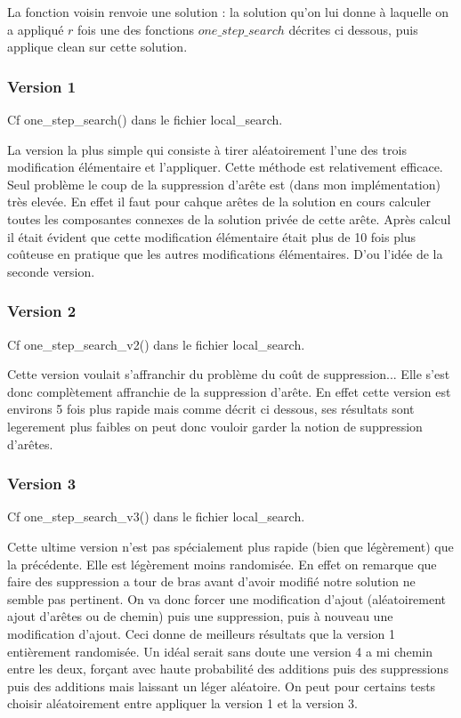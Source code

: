 \documentclass[10pt,a4paper]{article}
\begin{document}
La fonction voisin renvoie une solution : la solution qu'on lui donne à laquelle on a appliqué $r$ fois une des fonctions $one\_step\_search$ décrites ci dessous, puis applique clean sur cette solution.

\subsubsection{Version 1}

Cf one\_step\_search() dans le fichier local\_search.

La version la plus simple qui consiste à tirer aléatoirement l'une des trois modification élémentaire et l'appliquer. Cette méthode est relativement efficace. Seul problème le coup de la suppression d'arête est (dans mon implémentation) très elevée. En effet il faut pour cahque arêtes de la solution en cours calculer toutes les composantes connexes de la solution privée de cette arête. Après calcul il était évident que cette modification élémentaire était plus de 10 fois plus coûteuse en pratique que les autres modifications élémentaires. D'ou l'idée de la seconde version.

\subsubsection{Version 2}
Cf one\_step\_search\_v2() dans le fichier local\_search.

Cette version voulait s'affranchir du problème du coût de suppression... Elle s'est donc complètement affranchie de la suppression d'arête. En effet cette version est environs 5 fois plus rapide mais comme décrit ci dessous, ses résultats sont legerement plus faibles on peut donc vouloir garder la notion de suppression d'arêtes.

\subsubsection{Version 3}

Cf one\_step\_search\_v3() dans le fichier local\_search.

Cette ultime version n'est pas spécialement plus rapide (bien que légèrement) que la précédente. Elle est légèrement moins randomisée. En effet on remarque que faire des suppression a tour de bras avant d'avoir modifié notre solution ne semble pas pertinent. On va donc forcer une modification d'ajout (aléatoirement ajout d'arêtes ou de chemin) puis une suppression, puis à nouveau une modification d'ajout. Ceci donne de meilleurs résultats que la version 1 entièrement randomisée. Un idéal serait sans doute une version 4 a mi chemin entre les deux, forçant avec haute probabilité des additions puis des suppressions puis des additions mais laissant un léger aléatoire. On peut pour certains tests choisir aléatoirement entre appliquer la version 1 et la version 3. 
\end{document}
